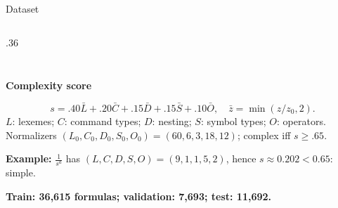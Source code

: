 \documentclass[11pt,aspectratio=43]{beamer}
\begin{document}
\begin{frame}[t]{Dataset}
\begin{columns}[T,onlytextwidth]
\begin{column}{.36\linewidth}
{\begin{tabular*}{\linewidth}{@{\extracolsep{\fill}}rr@{}}
\bottomrule\end{tabular*}}\par\vspace{2pt}
\end{column}\end{columns}\vspace{4pt}\textbf{Complexity score}\par\[s=.40\bar L+.20\bar C+.15\bar D+.15\bar S+.10\bar O,\quad \bar z=\min(z/z_0,2).\]{\scriptsize $L$: lexemes; $C$: command types; $D$: nesting; $S$: symbol types; $O$: operators.\\Normalizers $(L_0,C_0,D_0,S_0,O_0)=(60,6,3,18,12)$; complex iff $s\ge.65$.}\par\vspace{3pt}\textbf{Example:} $\frac{1}{s^a}$ has $(L,C,D,S,O)=(9,1,1,5,2)$, hence $s\approx0.202<0.65$: simple.\par\vspace{5pt}\textbf{Train: 36,615 formulas; validation: 7,693; test: 11,692.}

\end{frame}
\end{document}
